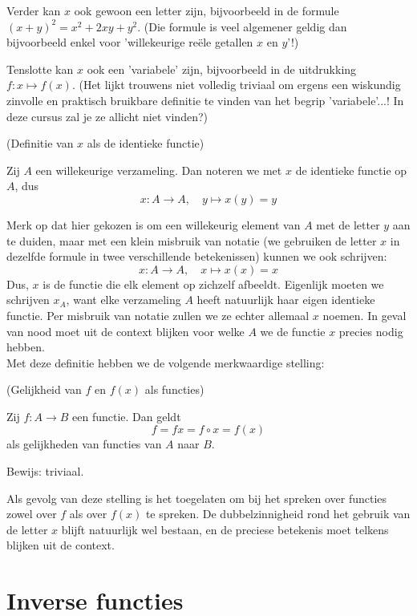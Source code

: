 \documentclass{ximera}
\begin{document}
Verder kan $x$ ook gewoon een letter zijn, bijvoorbeeld in de formule $(x+y)^2 = x^2+2xy+y^2$. (Die formule is veel algemener geldig dan bijvoorbeeld enkel voor 'willekeurige reële getallen $x$ en $y$'!)

Tenslotte kan $x$ ook een 'variabele' zijn, bijvoorbeeld in de uitdrukking $f:x\mapsto f(x)$. (Het lijkt trouwens niet volledig triviaal om ergens een wiskundig zinvolle en praktisch bruikbare definitie te vinden van het begrip 'variabele'...! In deze cursus zal je ze allicht niet vinden?)


\begin{definition} (Definitie van $x$ als de identieke functie)
	
	Zij $A$ een willekeurige verzameling. Dan noteren we met $x$ de identieke functie op $A$, dus
	$$
	x:A \to A,\quad y \mapsto x(y) = y
	$$
\end{definition}
Merk op dat hier gekozen is om een willekeurig element van $A$ met de letter $y$ aan te duiden, maar met een klein misbruik van notatie (we gebruiken de letter $x$ in dezelfde formule in twee verschillende betekenissen) kunnen we ook schrijven:
$$
	x:A \to A,\quad x \mapsto x(x) = x
$$
Dus, $x$ is de functie die elk element op zichzelf afbeeldt. Eigenlijk moeten we schrijven $x_A$, want elke verzameling $A$ heeft natuurlijk haar eigen identieke functie. Per misbruik van notatie zullen we ze echter allemaal $x$ noemen. In geval van nood moet uit de context blijken voor welke $A$ we de functie $x$ precies nodig hebben.
\\

Met deze definitie hebben we de volgende merkwaardige stelling:
\begin{proposition} (Gelijkheid van $f$ en $f(x)$ als functies)
	
	Zij $f:A\to B$ een functie. Dan geldt	
	$$
	f = fx = f\circ x = f(x)
	$$
	als gelijkheden van functies van $A$ naar $B$.
\end{proposition}
Bewijs: triviaal.

Als gevolg van deze stelling is het toegelaten om bij het spreken over functies zowel over $f$ als over $f(x)$ te spreken. De dubbelzinnigheid rond het gebruik van de letter $x$ blijft natuurlijk wel bestaan, en de preciese betekenis moet telkens blijken uit de context.


\section{Inverse functies}
\end{document}
